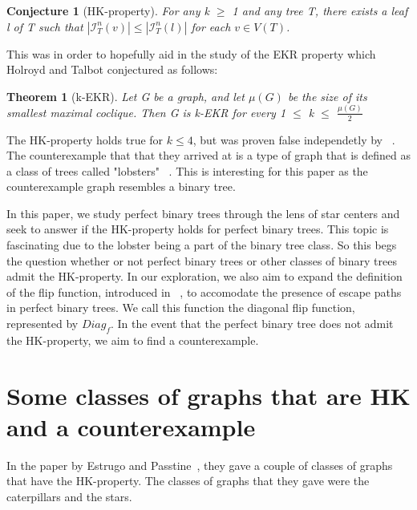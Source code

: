 \documentclass{amsart}
\newtheorem{theorem}{Theorem}[section]
\newtheorem{conj}{Conjecture}[section]
\theoremstyle{definition}
\begin{document}
\begin{conj}[HK-property]
  For any k $\geq$ 1 and any tree T, there exists a leaf l of T such that $\left|\mathcal{I}^n_T(v)\right| \leq \left|\mathcal{I}^n_T(l)\right|$ for each $v \in V(T)$.
\end{conj}

This was in order to hopefully aid in the study of the EKR property which Holroyd and Talbot \cite{MR2136060} conjectured as follows:

\begin{theorem}[k-EKR]
  Let G be a graph, and let $\mu(G)$ be the size of its smallest maximal coclique. Then G is k-EKR for every 1 $\leq$ k $\leq$ $\frac{\mu(G)}{2}$
\end{theorem}

The HK-property holds true for $k \leq 4$, but was proven false independetly by ~\cite{MR3271819, MR3612439, MR2523796}. The counterexample that that they arrived at is a type of graph that is defined as a class of trees called "lobsters" ~\cite{MR4245360}. This is interesting for this paper as the counterexample graph resembles a binary tree.

In this paper, we study perfect binary trees through the lens of star centers and seek to answer if the HK-property holds for perfect binary trees. This topic is fascinating due to the lobster being a part of the binary tree class. So this begs the question whether or not perfect binary trees or other classes of binary trees admit the HK-property. In our exploration, we also aim to expand the definition of the flip function, introduced in ~\cite{MR2763040}, to accomodate the presence of escape paths in perfect binary trees. We call this function the diagonal flip function, represented by $Diag_{f}$. In the event that the perfect binary tree does not admit the HK-property, we aim to find a counterexample.

\section{Some classes of graphs that are HK and a counterexample}

In the paper by Estrugo and Passtine~\cite{MR4245360}, they gave a couple of classes of graphs that have the HK-property. The classes of graphs that they gave were the caterpillars and the stars.
\end{document}
